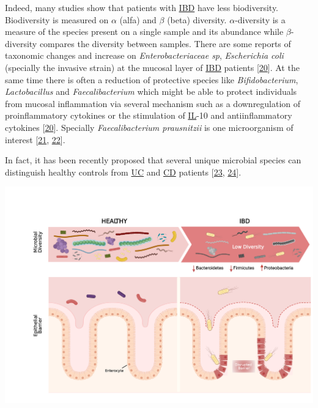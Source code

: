 \documentclass[
  12pt,
  a4paper,
  twoside,
  openright]{book}
\let\origfigure\figure
\let\endorigfigure\endfigure
\renewenvironment{figure}[1][2] {
    \expandafter\origfigure\expandafter[!htbp]
} {
    \endorigfigure
}
\begin{document}
Indeed, many studies show that patients with \protect\hyperlink{acronyms_IBD}{IBD} have less biodiversity.
Biodiversity is measured on \(\alpha\) (alfa) and \(\beta\) (beta) diversity.
\(\alpha\)-diversity is a measure of the species present on a single sample and its abundance while \(\beta\)-diversity compares the diversity between samples.
There are some reports of taxonomic changes and increase on \emph{Enterobacteriaceae sp}, \emph{Escherichia coli} (specially the invasive strain) at the mucosal layer of \protect\hyperlink{acronyms_IBD}{IBD} patients {[}\protect\hyperlink{ref-ott2004}{20}{]}.
At the same time there is often a reduction of protective species like \emph{Bifidobacterium}, \emph{Lactobacillus} and \emph{Faecalibacterium} which might be able to protect individuals from mucosal inflammation via several mechanism such as a downregulation of proinflammatory cytokines or the stimulation of \protect\hyperlink{acronyms_IL}{IL}-10 and antiinflammatory cytokines {[}\protect\hyperlink{ref-ott2004}{20}{]}.
Specially \emph{Faecalibacterium prausnitzii} is one microorganism of interest {[}\protect\hyperlink{ref-kostic2014}{21}, \protect\hyperlink{ref-sender2016}{22}{]}.

In fact, it has been recently proposed that several unique microbial species can distinguish healthy controls from \protect\hyperlink{acronyms_UC}{UC} and \protect\hyperlink{acronyms_CD}{CD} patients {[}\protect\hyperlink{ref-sankarasubramanian2020}{23}, \protect\hyperlink{ref-lopez-siles2014}{24}{]}.

\begin{figure}
\includegraphics[width=1\linewidth]{images/tesis_AM_Figure2} \caption[The microbial composition in the gut.]{The microbial composition in the gut. On the left healthy gut is represented as having a high microbiome diversity and no damage on the epithelial barrier. On the right the IBD gut were microbiome diversity is lower and some bacteria is in physical contact with the damaged epithelium. Adapted with permission from Mayorgas' 2021.}\label{fig:composition}
\end{figure}
\end{document}
